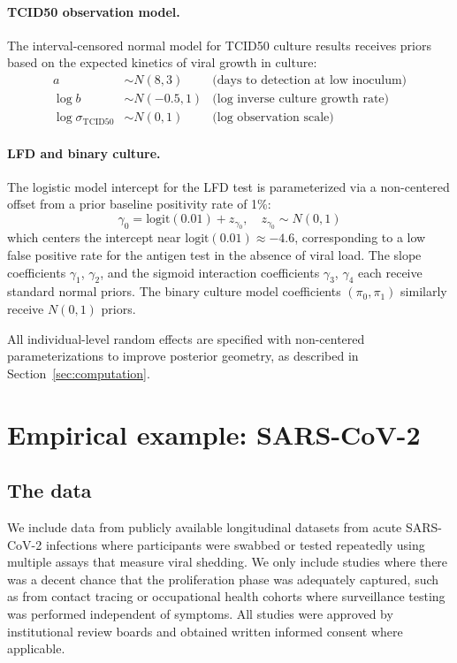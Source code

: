 \documentclass[12pt]{article}
\begin{document}
\paragraph{TCID50 observation model.} The interval-censored normal model for TCID50 culture results receives priors based on the expected kinetics of viral growth in culture:
\begin{align*}
    a &\sim N(8, 3) & \text{(days to detection at low inoculum)} \\
    \log b &\sim N(-0.5, 1) & \text{(log inverse culture growth rate)} \\
    \log \sigma_{\text{TCID50}} &\sim N(0, 1) & \text{(log observation scale)}
\end{align*}

\paragraph{LFD and binary culture.} The logistic model intercept for the LFD test is parameterized via a non-centered offset from a prior baseline positivity rate of 1\%:
\begin{equation*}
    \gamma_0 = \text{logit}(0.01) + z_{\gamma_0}, \quad z_{\gamma_0} \sim N(0, 1)
\end{equation*}
which centers the intercept near $\text{logit}(0.01) \approx -4.6$, corresponding to a low false positive rate for the antigen test in the absence of viral load. The slope coefficients $\gamma_1$, $\gamma_2$, and the sigmoid interaction coefficients $\gamma_3$, $\gamma_4$ each receive standard normal priors. The binary culture model coefficients $(\pi_0, \pi_1)$ similarly receive $N(0, 1)$ priors.

All individual-level random effects are specified with non-centered parameterizations to improve posterior geometry, as described in Section~\ref{sec:computation}.

\section{Empirical example: SARS-CoV-2}
\subsection{The data} \label{sec:data}
We include data from publicly available longitudinal datasets from acute SARS-CoV-2 infections where participants were swabbed or tested repeatedly using multiple assays that measure viral shedding. We only include studies where there was a decent chance that the proliferation phase was adequately captured, such as from contact tracing or occupational health cohorts where surveillance testing was performed independent of symptoms. All studies were approved by institutional review boards and obtained written informed consent where applicable.
\end{document}
